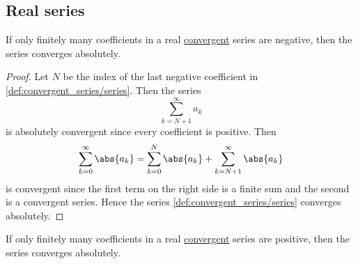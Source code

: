 \subsection{Real series}\label{subsec:real_series}

\begin{proposition}\label{thm:almost_all_terms_positive_implies_absolute_convergent}
  If only finitely many coefficients in a real \hyperref[def:convergent_series]{convergent} series are negative, then the series converges absolutely.
\end{proposition}
\begin{proof}
  Let \( N \) be the index of the last negative coefficient in \eqref{def:convergent_series/series}. Then the series
  \begin{equation*}
    \sum_{k={N+1}}^\infty a_k
  \end{equation*}
  is absolutely convergent since every coefficient is positive. Then
  \begin{equation*}
    \sum_{k=0}^\infty \abs{a_k} = \sum_{k=0}^N \abs{a_k} + \sum_{k=N+1}^\infty \abs{a_k}
  \end{equation*}
  is convergent since the first term on the right side is a finite sum and the second is a convergent series. Hence the series \eqref{def:convergent_series/series} converges absolutely.
\end{proof}

\begin{corollary}\label{thm:almost_all_terms_negative_implies_absolute_convergent}
  If only finitely many coefficients in a real \hyperref[def:convergent_series]{convergent} series are positive, then the series converges absolutely.
\end{corollary}

